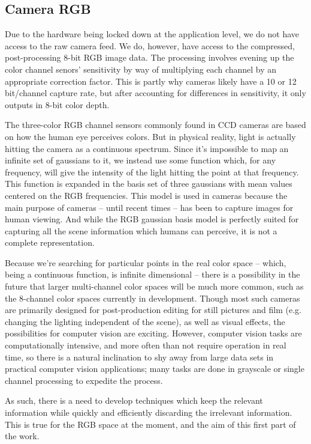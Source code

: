 \documentclass[10pt,a4paper]{article}
\begin{document}
\subsection{Camera RGB}\label{sec:CameraRGB}

Due to the hardware being locked down at the application level, we do not have access to the raw camera feed. We do, however, have access to the compressed, post-processing 8-bit RGB image data. The processing involves evening up the color channel senors' sensitivity by way of multiplying each channel by an appropriate correction factor. This is partly why cameras likely have a 10 or 12 bit/channel capture rate, but after accounting for differences in sensitivity, it only outputs in 8-bit color depth.

The three-color RGB channel sensors commonly found in CCD cameras are based on how the human eye perceives colors. But in physical reality, light is actually hitting the camera as a continuous spectrum. Since it's impossible to map an infinite set of gaussians to it, we instead use some function which, for any frequency, will give the intensity of the light hitting the point at that frequency. This function is expanded in the basis set of three gaussians with mean values centered on the RGB frequencies. This model is used in cameras because the main purpose of cameras -- until recent times -- has been to capture images for human viewing. And while the RGB gaussian basis model is perfectly suited for capturing all the scene information which humans can perceive, it is not a complete representation.

Because we're searching for particular points in the real color space -- which, being a continuous function, is infinite dimensional -- there is a possibility in the future that larger multi-channel color spaces will be much more common, such as the 8-channel color spaces currently in development. Though most such cameras are primarily designed for post-production editing for still pictures and film (e.g. changing the lighting independent of the scene), as well as visual effects, the possibilities for computer vision are exciting. However, computer vision tasks are computationally intensive, and more often than not require operation in real time, so there is a natural inclination to shy away from large data sets in practical computer vision applications; many tasks are done in grayscale or single channel processing to expedite the process.

As such, there is a need to develop techniques which keep the relevant information while quickly and efficiently discarding the irrelevant information. This is true for the RGB space at the moment, and the aim of this first part of the work.
\end{document}
